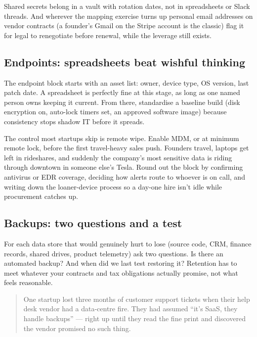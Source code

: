 Shared secrets belong in a vault with rotation dates, not in spreadsheets or Slack threads. And wherever the mapping exercise turns up personal email addresses on vendor contracts (a founder's Gmail on the Stripe account is the classic) flag it for legal to renegotiate before renewal, while the leverage still exists.



\subsection{Endpoints: spreadsheets beat wishful thinking}


The endpoint block starts with an asset list: owner, device type, OS version, last patch date. A spreadsheet is perfectly fine at this stage, as long as one named person owns keeping it current. From there, standardise a baseline build (disk encryption on, auto-lock timers set, an approved software image) because consistency stops shadow IT before it spreads.


The control most startups skip is remote wipe. Enable MDM, or at minimum remote lock, before the first travel-heavy sales push. Founders travel, laptops get left in rideshares, and suddenly the company's most sensitive data is riding through downtown in someone else's Tesla. Round out the block by confirming antivirus or EDR coverage, deciding how alerts route to whoever is on call, and writing down the loaner-device process so a day-one hire isn't idle while procurement catches up.



\subsection{Backups: two questions and a test}


For each data store that would genuinely hurt to lose (source code, CRM, finance records, shared drives, product telemetry) ask two questions. Is there an automated backup? And when did we last test restoring it? Retention has to meet whatever your contracts and tax obligations actually promise, not what feels reasonable.



\begin{quote}\small
One startup lost three months of customer support tickets when their help desk vendor had a data-centre fire. They had assumed ``it's SaaS, they handle backups'' — right up until they read the fine print and discovered the vendor promised no such thing.
\end{quote}


